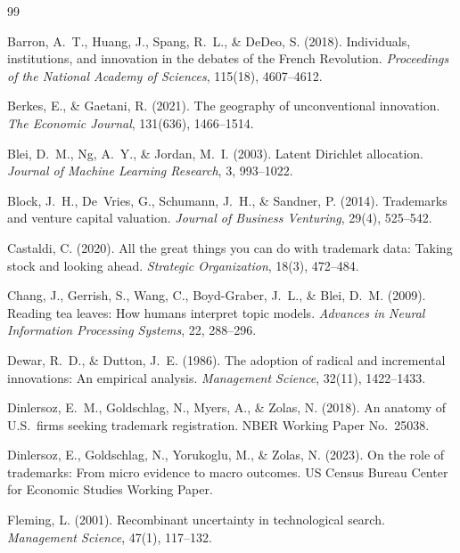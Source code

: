 \begin{thebibliography}{99}

Barron, A.~T., Huang, J., Spang, R.~L., \& DeDeo, S. (2018). Individuals,
institutions, and innovation in the debates of the French Revolution.
\emph{Proceedings of the National Academy of Sciences}, 115(18),
4607--4612.

Berkes, E., \& Gaetani, R. (2021). The geography of unconventional
innovation. \emph{The Economic Journal}, 131(636), 1466--1514.

Blei, D.~M., Ng, A.~Y., \& Jordan, M.~I. (2003). Latent Dirichlet
allocation. \emph{Journal of Machine Learning Research}, 3, 993--1022.

Block, J.~H., De~Vries, G., Schumann, J.~H., \& Sandner, P. (2014).
Trademarks and venture capital valuation. \emph{Journal of Business
Venturing}, 29(4), 525--542.

Castaldi, C. (2020). All the great things you can do with trademark data:
Taking stock and looking ahead. \emph{Strategic Organization}, 18(3),
472--484.

Chang, J., Gerrish, S., Wang, C., Boyd-Graber, J.~L., \& Blei, D.~M.
(2009). Reading tea leaves: How humans interpret topic models.
\emph{Advances in Neural Information Processing Systems}, 22, 288--296.

Dewar, R.~D., \& Dutton, J.~E. (1986). The adoption of radical and
incremental innovations: An empirical analysis. \emph{Management Science},
32(11), 1422--1433.

Dinlersoz, E.~M., Goldschlag, N., Myers, A., \& Zolas, N. (2018). An
anatomy of U.S.\ firms seeking trademark registration. NBER Working Paper
No.\ 25038.

Dinlersoz, E., Goldschlag, N., Yorukoglu, M., \& Zolas, N. (2023). On the
role of trademarks: From micro evidence to macro outcomes. US Census
Bureau Center for Economic Studies Working Paper.

Fleming, L. (2001). Recombinant uncertainty in technological search.
\emph{Management Science}, 47(1), 117--132.


\end{thebibliography}
